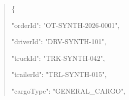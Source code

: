\begin{quote}\ttfamily
  \{\allowbreak{}\par
    "\allowbreak{}o\allowbreak{}r\allowbreak{}d\allowbreak{}e\allowbreak{}r\allowbreak{}I\allowbreak{}d\allowbreak{}"\allowbreak{}:\allowbreak{} "\allowbreak{}O\allowbreak{}T\allowbreak{}-\allowbreak{}S\allowbreak{}Y\allowbreak{}N\allowbreak{}T\allowbreak{}H\allowbreak{}-\allowbreak{}2\allowbreak{}0\allowbreak{}2\allowbreak{}6\allowbreak{}-\allowbreak{}0\allowbreak{}0\allowbreak{}0\allowbreak{}1\allowbreak{}"\allowbreak{},\allowbreak{}\par
    "\allowbreak{}d\allowbreak{}r\allowbreak{}i\allowbreak{}v\allowbreak{}e\allowbreak{}r\allowbreak{}I\allowbreak{}d\allowbreak{}"\allowbreak{}:\allowbreak{} "\allowbreak{}D\allowbreak{}R\allowbreak{}V\allowbreak{}-\allowbreak{}S\allowbreak{}Y\allowbreak{}N\allowbreak{}T\allowbreak{}H\allowbreak{}-\allowbreak{}1\allowbreak{}0\allowbreak{}1\allowbreak{}"\allowbreak{},\allowbreak{}\par
    "\allowbreak{}t\allowbreak{}r\allowbreak{}u\allowbreak{}c\allowbreak{}k\allowbreak{}I\allowbreak{}d\allowbreak{}"\allowbreak{}:\allowbreak{} "\allowbreak{}T\allowbreak{}R\allowbreak{}K\allowbreak{}-\allowbreak{}S\allowbreak{}Y\allowbreak{}N\allowbreak{}T\allowbreak{}H\allowbreak{}-\allowbreak{}0\allowbreak{}4\allowbreak{}2\allowbreak{}"\allowbreak{},\allowbreak{}\par
    "\allowbreak{}t\allowbreak{}r\allowbreak{}a\allowbreak{}i\allowbreak{}l\allowbreak{}e\allowbreak{}r\allowbreak{}I\allowbreak{}d\allowbreak{}"\allowbreak{}:\allowbreak{} "\allowbreak{}T\allowbreak{}R\allowbreak{}L\allowbreak{}-\allowbreak{}S\allowbreak{}Y\allowbreak{}N\allowbreak{}T\allowbreak{}H\allowbreak{}-\allowbreak{}0\allowbreak{}1\allowbreak{}5\allowbreak{}"\allowbreak{},\allowbreak{}\par
    "\allowbreak{}c\allowbreak{}a\allowbreak{}r\allowbreak{}g\allowbreak{}o\allowbreak{}T\allowbreak{}y\allowbreak{}p\allowbreak{}e\allowbreak{}"\allowbreak{}:\allowbreak{} "\allowbreak{}G\allowbreak{}E\allowbreak{}N\allowbreak{}E\allowbreak{}R\allowbreak{}A\allowbreak{}L\allowbreak{}\_\allowbreak{}C\allowbreak{}A\allowbreak{}R\allowbreak{}G\allowbreak{}O\allowbreak{}"\allowbreak{},\allowbreak{}\par

\end{quote}
